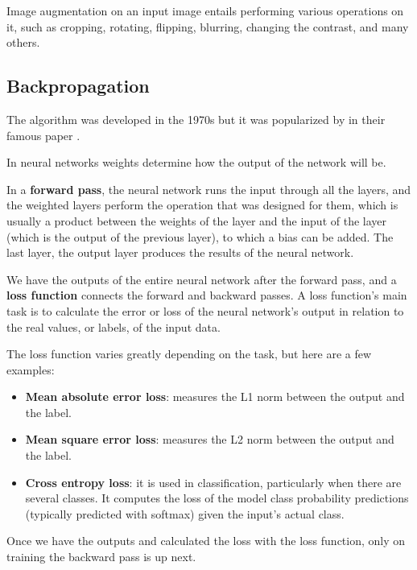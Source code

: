 \documentclass{report}[12pt, a4paper]
\begin{document}
Image augmentation on an input image entails performing various operations on it, such as cropping, rotating, flipping, blurring, changing the contrast, and many others.

\subsection{Backpropagation}

The algorithm was developed in the 1970s but it was popularized by \citeauthor{backpropagation_paper} in their famous  paper \cite{backpropagation_paper}.

In neural networks weights determine how the output of the network will be. 

In a \textbf{forward pass}, the neural network runs the input through all the layers, and the weighted layers perform the operation that was designed for them, which is usually a product between the weights of the layer and the input of the layer (which is the output of the previous layer), to which a bias can be added. The last layer, the output layer produces the results of the neural network.

We have the outputs of the entire neural network after the forward pass, and a \textbf{loss function} connects the forward and backward passes. A loss function's main task is to calculate the error or loss of the neural network's output in relation to the real values, or labels, of the input data.

The loss function varies greatly depending on the task, but here are a few examples:

\begin{itemize}
    \item \textbf{Mean absolute error loss}: measures the L1 norm between the output and the label.
    \item \textbf{Mean square error loss}: measures the L2 norm between the output and the label.
    \item \textbf{Cross entropy loss}: it is used in classification, particularly when there are several classes. It computes the loss of the model class probability predictions (typically predicted with softmax) given the input's actual class.
\end{itemize}

Once we have the outputs and calculated the loss with the loss function, only on training the backward pass is up next. 
\end{document}
